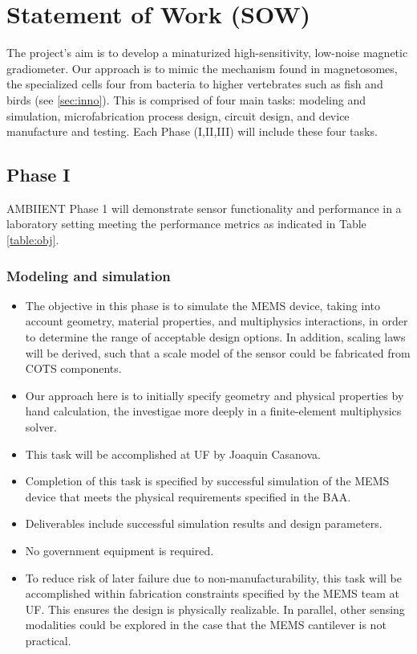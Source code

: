 
\section{Statement of Work (SOW)}
The project's aim is to develop a minaturized high-sensitivity, low-noise magnetic gradiometer. Our approach is to mimic the mechanism found in magnetosomes, the specialized cells four from bacteria to higher vertebrates such as fish and birds (see \ref{sec:inno}). This is comprised of four main tasks: modeling and simulation, microfabrication process design, circuit design, and device manufacture and testing. Each Phase (I,II,III) will include these four tasks.

\subsection{Phase I}

AMBIIENT Phase 1 will demonstrate sensor functionality and performance in a laboratory
setting meeting the performance metrics as indicated in Table \ref{table:obj}. 

\subsubsection{Modeling and simulation}\label{sec:p1:em}
\begin{itemize}
\item The objective in this phase is to simulate the MEMS device, taking into account geometry, material properties, and multiphysics interactions, in order to determine the range of acceptable design options. In addition, scaling laws will be derived, such that a scale model of the sensor could be fabricated from COTS components.
\item Our approach here is to initially specify geometry and physical properties by hand calculation, the investigae more deeply in a finite-element multiphysics solver.
\item This task will be accomplished at UF by Joaquin Casanova.
\item Completion of this task is specified by successful simulation of the MEMS device that meets the physical requirements specified in the BAA.
\item Deliverables include successful simulation results and design parameters.
\item No government equipment is required.
\item To reduce risk of later failure due to non-manufacturability, this task will be accomplished within fabrication constraints specified by the MEMS team at UF. This ensures the design is physically realizable. In parallel, other sensing modalities could be explored in the case that the MEMS cantilever is not practical.
\end{itemize}
